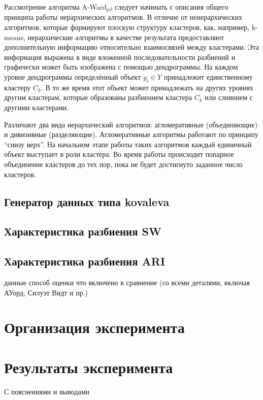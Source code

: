 \documentclass[12pt]{a&t}
\begin{document}
Рассмотрение алгоритма \mbox{A-Ward$ _{p\beta} $} следует начинать с описания общего принципа работы иерархических алгоритмов. В отличие от неиерархических алгоритмов, которые формируют плоскую структуру кластеров, как, например, \mbox{k-means}, иерархические алгоритмы в качестве результата предоставляют дополнительную информацию относительно взаимосвязей между кластерами. Эта информация выражена в виде вложенной последовательности разбиений \cite{Amorim-Makarenkov-Mirkin} и графически может быть изображена с помощью дендрограммы. На каждом уровне дендрограммы определённый объект $ y_i \in Y$ принадлежит единственному кластеру $ C_k $. В то же время этот объект может принадлежать на других уровнях другим кластерам, которые образованы разбиением кластера $ C_k $ или слиянием с другими кластерами. 

Различают два вида иерархический  алгоритмов: агломеративные (объединяющие) и дивизивные (разделяющие). Агломеративные алгоритмы работают по принципу ``снизу верх''. На начальном этапе работы таких алгоритмов каждый единичный объект выступает в роли кластера. Во время работы происходит попарное объединение кластеров до тех пор, пока не будет достигнуто заданное число кластеров. 

\newpage
\subsection{Генератор данных типа kovaleva}\label{sec:data-generation}
\subsection{Характеристика разбиения SW}\label{sec:sw}
\subsection{Характеристика разбиения ARI}\label{sec:ari}

данные 
способ оценки
что включено в сравнение
(со всеми деталями, включая АУорд, Силуэт Видт и пр.)


\section{Организация эксперимента}

\section{Результаты эксперимента}
С пояснениями и выводами
\end{document}

